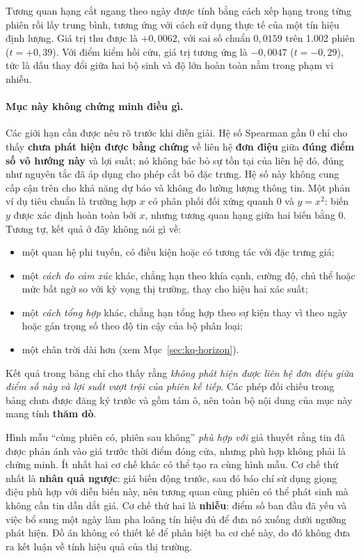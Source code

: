 \documentclass[12pt, a4paper, oneside]{report}
\begin{document}
Tương quan hạng cắt ngang theo ngày được tính bằng cách xếp hạng trong từng phiên rồi lấy trung bình,
tương ứng với cách sử dụng thực tế của một tín hiệu định lượng. Giá trị thu được là $+0{,}0062$, với sai số chuẩn $0{,}0159$
trên 1.002 phiên ($t = +0{,}39$). Với điểm kiểm hồi cứu, giá trị tương ứng là $-0{,}0047$
($t = -0{,}29$), tức là dấu thay đổi giữa hai bộ sinh và độ lớn hoàn toàn nằm trong phạm vi nhiễu.

\paragraph{Mục này không chứng minh điều gì.}
Các giới hạn cần được nêu rõ trước khi diễn giải. Hệ số Spearman gần 0 chỉ cho thấy \textbf{chưa phát hiện được bằng chứng} về liên hệ
\textbf{đơn điệu} giữa \textbf{đúng điểm số vô hướng này} và lợi suất; nó không bác bỏ sự tồn tại của liên hệ đó, đúng như nguyên tắc đã áp dụng cho phép
cắt bỏ đặc trưng. Hệ số này không cung cấp cận trên cho khả năng dự báo và
không đo lường lượng thông tin. Một phản ví dụ tiêu chuẩn là trường hợp
$x$ có phân phối đối xứng quanh 0 và $y = x^2$: biến $y$ được xác định hoàn toàn bởi $x$,
nhưng tương quan hạng giữa hai biến bằng 0. Tương tự, kết quả ở đây không nói gì về:

\begin{itemize}[nosep]
  \item một quan hệ phi tuyến, có điều kiện hoặc có tương tác với đặc trưng giá;
  \item một \emph{cách đo cảm xúc} khác, chẳng hạn theo khía cạnh, cường độ, chủ thể hoặc mức bất
        ngờ so với kỳ vọng thị trường, thay cho hiệu hai xác suất;
  \item một \emph{cách tổng hợp} khác, chẳng hạn tổng hợp theo sự kiện thay vì theo ngày hoặc
        gán trọng số theo độ tin cậy của bộ phân loại;
  \item một chân trời dài hơn (xem Mục~\ref{sec:kq-horizon}).
\end{itemize}

Kết quả trong bảng chỉ cho thấy rằng \emph{không phát hiện được liên hệ đơn điệu giữa điểm số này và
lợi suất vượt trội của phiên kế tiếp}. Các phép đối chiếu trong bảng chưa được đăng ký
trước và gồm tám ô, nên toàn bộ nội dung của mục này mang tính \textbf{thăm dò}.

Hình mẫu ``cùng phiên có, phiên sau không'' \emph{phù hợp với} giả thuyết rằng tin đã
được phản ánh vào giá trước thời điểm đóng cửa, nhưng phù hợp không phải là chứng minh. Ít nhất
hai cơ chế khác có thể tạo ra cùng hình mẫu. Cơ chế thứ nhất là \textbf{nhân quả ngược}: giá biến động trước,
sau đó báo chí sử dụng giọng điệu phù hợp với diễn biến này, nên tương quan cùng phiên có thể phát sinh mà không cần
tin dẫn dắt giá. Cơ chế thứ hai là \textbf{nhiễu}: điểm số ban đầu đã yếu và việc bổ sung một ngày làm pha loãng
tín hiệu đủ để đưa nó xuống dưới ngưỡng phát hiện. Đồ án không có thiết kế để phân biệt ba cơ chế này,
do đó không đưa ra kết luận về tính hiệu quả của thị trường.
\end{document}
